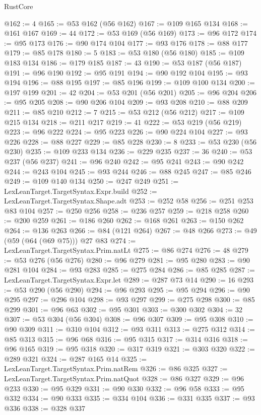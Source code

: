 \begin{lexlean}{RustCore}
\begin{coremodule}
@162 := 4
@165 := @53 @162 (@56 @162)
@167 := @109 @165 @134
@168 := @161 @167
@169 := 44
@172 := @53 @169 (@56 @169)
@173 := @96 @172
@174 := @95 @173
@176 := @90 @174 @104
@177 := @93 @176
@178 := @88 @177
@179 := @85 @178
@180 := 5
@183 := @53 @180 (@56 @180)
@185 := @109 @183 @134
@186 := @179 @185
@187 := 43
@190 := @53 @187 (@56 @187)
@191 := @96 @190
@192 := @95 @191
@194 := @90 @192 @104
@195 := @93 @194
@196 := @88 @195
@197 := @85 @196
@199 := @109 @100 @134
@200 := @197 @199
@201 := 42
@204 := @53 @201 (@56 @201)
@205 := @96 @204
@206 := @95 @205
@208 := @90 @206 @104
@209 := @93 @208
@210 := @88 @209
@211 := @85 @210
@212 := 7
@215 := @53 @212 (@56 @212)
@217 := @109 @215 @134
@218 := @211 @217
@219 := 41
@222 := @53 @219 (@56 @219)
@223 := @96 @222
@224 := @95 @223
@226 := @90 @224 @104
@227 := @93 @226
@228 := @88 @227
@229 := @85 @228
@230 := 8
@233 := @53 @230 (@56 @230)
@235 := @109 @233 @134
@236 := @229 @235
@237 := 36
@240 := @53 @237 (@56 @237)
@241 := @96 @240
@242 := @95 @241
@243 := @90 @242
@244 := @243 @104
@245 := @93 @244
@246 := @88 @245
@247 := @85 @246
@249 := @109 @140 @134
@250 := @247 @249
@251 := LexLeanTarget.TargetSyntax.Expr.build
@252 := LexLeanTarget.TargetSyntax.Shape.adt
@253 := @252 @58
@256 := @251 @253 @83 @104
@257 := @250 @256
@258 := @236 @257
@259 := @218 @258
@260 := @200 @259
@261 := @186 @260
@262 := @168 @261
@263 := @150 @262
@264 := @136 @263
@266 := @84 (@121 @264)
@267 := @48 @266
@273 := @49 (@59 (@64 (@69 @75))) @27 @83
@274 := LexLeanTarget.TargetSyntax.Prim.natLt
@275 := @86 @274
@276 := 48
@279 := @53 @276 (@56 @276)
@280 := @96 @279
@281 := @95 @280
@283 := @90 @281 @104
@284 := @93 @283
@285 := @275 @284
@286 := @85 @285
@287 := LexLeanTarget.TargetSyntax.Expr.let
@289 := @287 @73 @14
@290 := 16
@293 := @53 @290 (@56 @290)
@294 := @96 @293
@295 := @95 @294
@296 := @90 @295
@297 := @296 @104
@298 := @93 @297
@299 := @275 @298
@300 := @85 @299
@301 := @96 @63
@302 := @95 @301
@303 := @300 @302
@304 := 32
@307 := @53 @304 (@56 @304)
@308 := @96 @307
@309 := @95 @308
@310 := @90 @309
@311 := @310 @104
@312 := @93 @311
@313 := @275 @312
@314 := @85 @313
@315 := @96 @68
@316 := @95 @315
@317 := @314 @316
@318 := @96 @165
@319 := @95 @318
@320 := @317 @319
@321 := @303 @320
@322 := @289 @321
@324 := @287 @165 @14
@325 := LexLeanTarget.TargetSyntax.Prim.natRem
@326 := @86 @325
@327 := LexLeanTarget.TargetSyntax.Prim.natQuot
@328 := @86 @327
@329 := @96 @233
@330 := @95 @329
@331 := @90 @330
@332 := @96 @58
@333 := @95 @332
@334 := @90 @333
@335 := @334 @104
@336 := @331 @335
@337 := @93 @336
@338 := @328 @337

\end{coremodule}
\end{lexlean}
